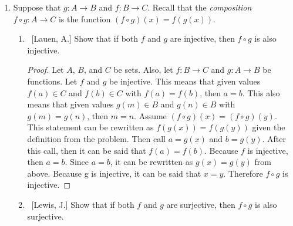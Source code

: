 \documentclass[10pt]{article}
\begin{document}
\begin{enumerate}
\begin{enumerate}
	\end{enumerate}
	
\item  Suppose that $g: A \to B$ and $f:B \to C$.  Recall that the \emph{composition} $f \circ g: A \to C$ is the function $(f \circ g)(x) = f(g(x))$.

	\begin{enumerate}
	
			\item  {~[Lauen, A.] Show that if both $f$ and $g$ are injective, then $f \circ g$ is also injective.}
\begin{proof}
Let $A$, $B$, and $C$ be sets.  Also, let $f: B \xrightarrow{} C$ and $g:  A\xrightarrow{} B$ be functions.  Let $f$ and $g$ be injective.  This means that given values $f(a) \in C$ and $f(b) \in C$ with $f(a)=f(b)$, then $a = b$.  This also means that given values $g(m) \in B$ and $g(n) \in B$ with $g(m)=g(n)$, then $m = n$.  Assume $(f \circ g)(x) = (f \circ g)(y)$.  This statement can be rewritten as $f(g(x)) = f(g(y))$ given the definition from the problem.  Then call $a = g(x)$ and $b = g(y)$.  After this call, then it can be said that $f(a) = f(b)$.  Because $f$ is injective, then $a=b$.  Since $a = b$, it can be rewritten as $g(x) = g(y)$ from above.  Because g is injective, it can be said that $x=y$.  Therefore $f \circ g$ is injective.
\end{proof}
	\item  ~[Lewis, J.] Show that if both $f$ and $g$ are surjective, then $f \circ g$ is also surjective.
	\end{enumerate}

\end{enumerate}
\end{document}
